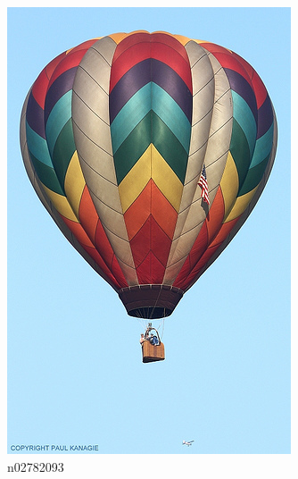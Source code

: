 \documentclass[11pt, a4paper]{article}
\begin{document}
\begin{figure}[h!tb]
\begin{subfigure}[b]{0.30\textwidth}
        \includegraphics[width=\textwidth]{imagenet/examples/n02782093_1001.JPEG}
        \caption{n02782093}
        \label{fig:imagenet-examples-5}
    \end{subfigure}
    ~ %
    \begin{subfigure}[b]{0.30\textwidth}
    		\centering

\end{subfigure}
\end{figure}
\end{document}

